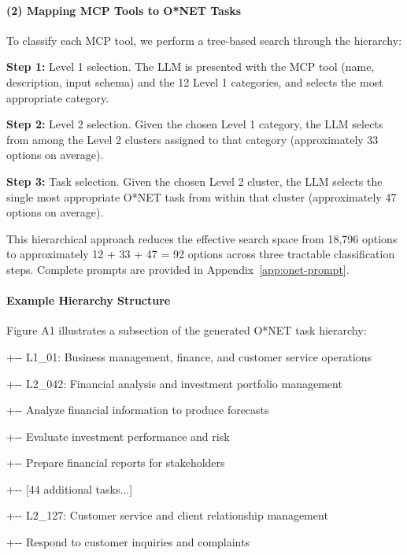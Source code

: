 \documentclass[manuscript,screen,nonacm,oneside]{acmart}
\begin{document}
\paragraph{(2) Mapping MCP Tools to O*NET Tasks}\label{mapping-mcp-tools-to-onet-tasks}

To classify each MCP tool, we perform a tree-based search through the hierarchy:

\textbf{Step 1:} Level 1 selection. The LLM is presented with the MCP tool (name, description, input schema) and the 12 Level 1 categories, and selects the most appropriate category.

\textbf{Step 2:} Level 2 selection. Given the chosen Level 1 category, the LLM selects from among the Level 2 clusters assigned to that category (approximately 33 options on average).

\textbf{Step 3:} Task selection. Given the chosen Level 2 cluster, the LLM selects the single most appropriate O*NET task from within that cluster (approximately 47 options on average).

This hierarchical approach reduces the effective search space from 18,796 options to approximately 12 + 33 + 47 = 92 options across three tractable classification steps. Complete prompts are provided in Appendix~\ref{app:onet-prompt}.

\paragraph{Example Hierarchy Structure}\label{example-hierarchy-structure}

Figure A1 illustrates a subsection of the generated O*NET task hierarchy:

+-\/- L1\_01: Business management, finance, and customer service operations

\textbar{} +-\/- L2\_042: Financial analysis and investment portfolio management

\textbar{} \textbar{} +-\/- Analyze financial information to produce forecasts

\textbar{} \textbar{} +-\/- Evaluate investment performance and risk

\textbar{} \textbar{} +-\/- Prepare financial reports for stakeholders

\textbar{} \textbar{} +-\/- {[}44 additional tasks...{]}

\textbar{} +-\/- L2\_127: Customer service and client relationship management

\textbar{} \textbar{} +-\/- Respond to customer inquiries and complaints
\end{document}
